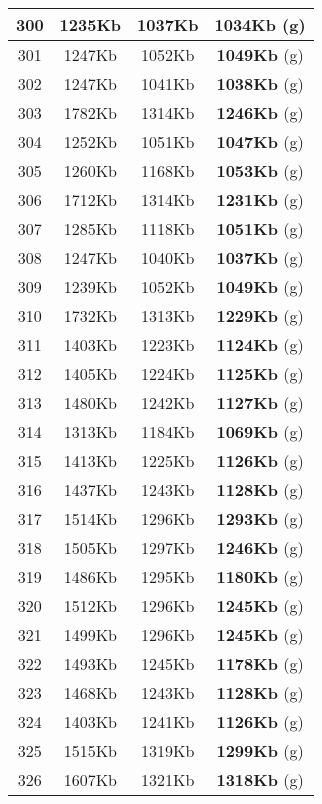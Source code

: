 \begin{table}[H]
\begin{minipage}{5cm}
{\begin{tabular}{|c|c|c|c|}
\hline
300 & 1235Kb & 1037Kb & \textbf{1034Kb} (g) \\
\hline
301 & 1247Kb & 1052Kb & \textbf{1049Kb} (g) \\
\hline
302 & 1247Kb & 1041Kb & \textbf{1038Kb} (g) \\
\hline
303 & 1782Kb & 1314Kb & \textbf{1246Kb} (g) \\
\hline
304 & 1252Kb & 1051Kb & \textbf{1047Kb} (g) \\
\hline
305 & 1260Kb & 1168Kb & \textbf{1053Kb} (g) \\
\hline
306 & 1712Kb & 1314Kb & \textbf{1231Kb} (g) \\
\hline
307 & 1285Kb & 1118Kb & \textbf{1051Kb} (g) \\
\hline
308 & 1247Kb & 1040Kb & \textbf{1037Kb} (g) \\
\hline
309 & 1239Kb & 1052Kb & \textbf{1049Kb} (g) \\
\hline
310 & 1732Kb & 1313Kb & \textbf{1229Kb} (g) \\
\hline
311 & 1403Kb & 1223Kb & \textbf{1124Kb} (g) \\
\hline
312 & 1405Kb & 1224Kb & \textbf{1125Kb} (g) \\
\hline
313 & 1480Kb & 1242Kb & \textbf{1127Kb} (g) \\
\hline
314 & 1313Kb & 1184Kb & \textbf{1069Kb} (g) \\
\hline
315 & 1413Kb & 1225Kb & \textbf{1126Kb} (g) \\
\hline
316 & 1437Kb & 1243Kb & \textbf{1128Kb} (g) \\
\hline
317 & 1514Kb & 1296Kb & \textbf{1293Kb} (g) \\
\hline
318 & 1505Kb & 1297Kb & \textbf{1246Kb} (g) \\
\hline
319 & 1486Kb & 1295Kb & \textbf{1180Kb} (g) \\
\hline
320 & 1512Kb & 1296Kb & \textbf{1245Kb} (g) \\
\hline
321 & 1499Kb & 1296Kb & \textbf{1245Kb} (g) \\
\hline
322 & 1493Kb & 1245Kb & \textbf{1178Kb} (g) \\
\hline
323 & 1468Kb & 1243Kb & \textbf{1128Kb} (g) \\
\hline
324 & 1403Kb & 1241Kb & \textbf{1126Kb} (g) \\
\hline
325 & 1515Kb & 1319Kb & \textbf{1299Kb} (g) \\
\hline
326 & 1607Kb & 1321Kb & \textbf{1318Kb} (g) \\
\hline
\end{tabular}
}

\end{minipage}
\end{table}
